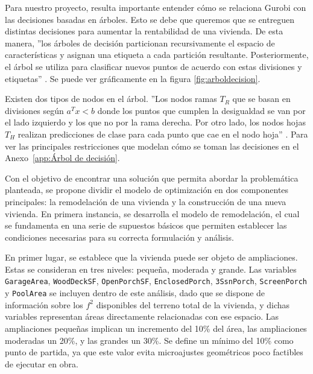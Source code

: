 Para nuestro proyecto, resulta importante entender cómo se relaciona Gurobi con las decisiones basadas en árboles. Esto se debe que queremos que se entreguen distintas decisiones para aumentar la rentabilidad de una vivienda.
De esta manera, ''los árboles de decisión particionan recursivamente el espacio de características y asignan una etiqueta a cada partición resultante. Posteriormente, el árbol se utiliza para clasificar nuevos puntos de acuerdo con estas divisiones y etiquetas'' \cite{Bertsimas2017}. Se puede ver gráficamente en la figura \ref{fig:arboldecision}.

Existen dos tipos de nodos en el árbol. ''Los nodos ramas $T_R$ que se basan en divisiones según $a^T x < b$ donde los puntos que cumplen la desigualdad se van por el lado izquierdo y los que no por la rama derecha. Por otro lado, los nodos hojas $T_H$ realizan predicciones de clase para cada punto que cae en el nodo hoja'' \cite{Bertsimas2017}. Para ver las principales restricciones que modelan cómo se toman las decisiones en el Anexo~\ref{app:Árbol de decisión}.

Con el objetivo de encontrar una solución que permita abordar la problemática planteada, se propone dividir el modelo de optimización en dos componentes principales: la remodelación de una vivienda y la construcción de una nueva vivienda. En primera instancia, se desarrolla el modelo de remodelación, el cual se fundamenta en una serie de supuestos básicos que permiten establecer las condiciones necesarias para su correcta formulación y análisis. 

En primer lugar, se establece que la vivienda puede ser objeto de ampliaciones. Estas se consideran en tres niveles: pequeña, moderada y grande. Las variables \texttt{GarageArea}, \texttt{WoodDeckSF}, \texttt{OpenPorchSF}, \texttt{EnclosedPorch}, \texttt{3SsnPorch}, \texttt{ScreenPorch} y \texttt{PoolArea} se incluyen dentro de este análisis, dado que se dispone de información sobre los $f^{2}$ disponibles del terreno total de la vivienda, y dichas variables representan áreas directamente relacionadas con ese espacio. Las ampliaciones pequeñas implican un incremento del 10\% del área, las ampliaciones moderadas un 20\%, y las grandes un 30\%. Se define un mínimo del 10\% como punto de partida, ya que este valor evita microajustes geométricos poco factibles de ejecutar en obra.

